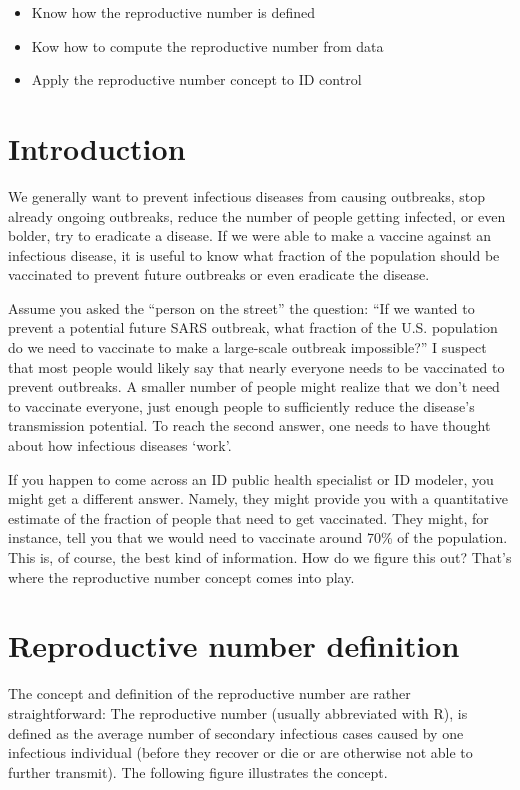 \documentclass[]{book}
\providecommand{\tightlist}{%
  \setlength{\itemsep}{0pt}\setlength{\parskip}{0pt}}
\theoremstyle{definition}
\theoremstyle{definition}
\theoremstyle{definition}
\theoremstyle{remark}
\begin{document}
\begin{itemize}
\tightlist
\item
  Know how the reproductive number is defined
\item
  Kow how to compute the reproductive number from data
\item
  Apply the reproductive number concept to ID control
\end{itemize}

\section{Introduction}\label{introduction-3}

We generally want to prevent infectious diseases from causing outbreaks,
stop already ongoing outbreaks, reduce the number of people getting
infected, or even bolder, try to eradicate a disease. If we were able to
make a vaccine against an infectious disease, it is useful to know what
fraction of the population should be vaccinated to prevent future
outbreaks or even eradicate the disease.

Assume you asked the ``person on the street'' the question: ``If we
wanted to prevent a potential future SARS outbreak, what fraction of the
U.S. population do we need to vaccinate to make a large-scale outbreak
impossible?'' I suspect that most people would likely say that nearly
everyone needs to be vaccinated to prevent outbreaks. A smaller number
of people might realize that we don't need to vaccinate everyone, just
enough people to sufficiently reduce the disease's transmission
potential. To reach the second answer, one needs to have thought about
how infectious diseases `work'.

If you happen to come across an ID public health specialist or ID
modeler, you might get a different answer. Namely, they might provide
you with a quantitative estimate of the fraction of people that need to
get vaccinated. They might, for instance, tell you that we would need to
vaccinate around 70\% of the population. This is, of course, the best
kind of information. How do we figure this out? That's where the
reproductive number concept comes into play.

\section{Reproductive number
definition}\label{reproductive-number-definition}

The concept and definition of the reproductive number are rather
straightforward: The reproductive number (usually abbreviated with R),
is defined as the average number of secondary infectious cases caused by
one infectious individual (before they recover or die or are otherwise
not able to further transmit). The following figure illustrates the
concept.
\end{document}

